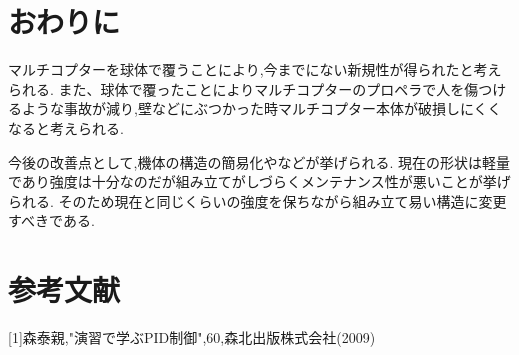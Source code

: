 \documentclass[a4paper]{jarticle}
\begin{document}
\section{おわりに}
マルチコプターを球体で覆うことにより,今までにない新規性が得られたと考えられる.
また、球体で覆ったことによりマルチコプターのプロペラで人を傷つけるような事故が減り,壁などにぶつかった時マルチコプター本体が破損しにくくなると考えられる.

今後の改善点として,機体の構造の簡易化やなどが挙げられる.
現在の形状は軽量であり強度は十分なのだが組み立てがしづらくメンテナンス性が悪いことが挙げられる.
そのため現在と同じくらいの強度を保ちながら組み立て易い構造に変更すべきである.

\section{参考文献}
[1]森泰親,"演習で学ぶPID制御",60,森北出版株式会社(2009)
\end{document}
